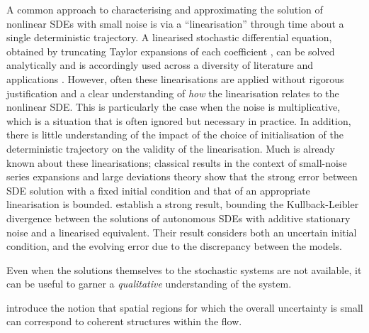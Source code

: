 A common approach to characterising and approximating the solution of nonlinear SDEs with small noise is via a ``linearisation'' through time about a single deterministic trajectory.
A linearised stochastic differential equation, obtained by truncating Taylor expansions of each coefficient \citep[e.g.]{Jazwinski_2014_StochasticProcessesFiltering,Blagoveshchenskii_1962_DiffusionProcessesDepending}, can be solved analytically and is accordingly used across a diversity of literature and applications \citep{Jazwinski_2014_StochasticProcessesFiltering,SarkkaSolin_2019_AppliedStochasticDifferential,KaszasHaller_2020_UniversalUpperEstimate,ArchambeauEtAl_2007_GaussianProcessApproximations,Sanz-AlonsoStuart_2017_GaussianApproximationsSmall,LawEtAl_2015_DataAssimilationMathematical,ReichCotter_2015_ProbabilisticForecastingBayesian,BudhirajaEtAl_2019_AssimilatingDataModels}.
However, often these linearisations are applied without rigorous justification and a clear understanding of \emph{how} the linearisation relates to the nonlinear SDE.
This is particularly the case when the noise is multiplicative, which is a situation that is often ignored but necessary in practice.
In addition, there is little understanding of the impact of the choice of initialisation of the deterministic trajectory on the validity of the linearisation.
Much is already known about these linearisations; classical results in the context of small-noise series expansions \citep{Blagoveshchenskii_1962_DiffusionProcessesDepending} and large deviations theory \citep{FreidlinWentzell_1998_RandomPerturbationsDynamical} show that the strong error between SDE solution with a fixed initial condition and that of an appropriate linearisation is bounded.
\citet{Sanz-AlonsoStuart_2017_GaussianApproximationsSmall} establish a strong result, bounding the Kullback-Leibler divergence between the solutions of autonomous SDEs with additive stationary noise and a linearised equivalent. Their result considers both an uncertain initial condition, and the evolving error due to the discrepancy between the models.


Even when the solutions themselves to the stochastic systems are not available, it can be useful to garner a \emph{qualitative} understanding of the system.

\citet{Balasuriya_2020_StochasticSensitivityComputable} introduce the notion that spatial regions for which the overall uncertainty is small can correspond to coherent structures within the flow.


